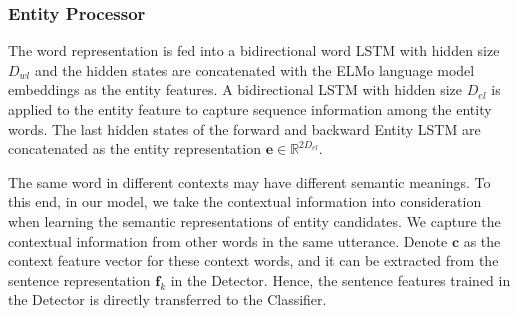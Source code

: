 \documentclass[11pt,a4paper]{article}
\begin{document}
\subsubsection{Entity Processor}
The word representation is fed into a bidirectional word LSTM with hidden size $D_{wl}$ and the hidden states are concatenated with the ELMo language model embeddings as the entity features. 
A bidirectional LSTM with hidden size $D_{el}$ is applied to the entity feature to capture sequence information among the entity words. The last hidden states of the forward and backward Entity LSTM are concatenated as the entity representation $\mathbf{e} \in \mathbb{R}^{2D_{el}}$. 

The same word in different contexts may have different semantic meanings. 
To this end, in our model, we take the contextual information into consideration when learning the semantic representations of entity candidates. 
We capture the contextual information from other words in the same utterance. Denote $\mathbf{c}$ as the context feature vector for these context words, and it can be extracted from the sentence representation $\mathbf{f}_{k}$ in the Detector.
Hence, the sentence features trained in the Detector is directly transferred to the Classifier.
\end{document}

